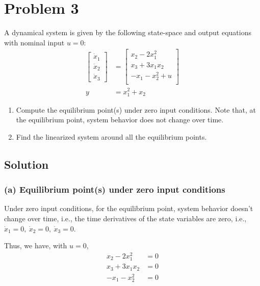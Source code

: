 \section*{Problem 3}

A dynamical system is given by the following state-space and output equations with nominal input \( u = 0\):
\begin{align*}
    \begin{bmatrix}
        \dot{x}_1 \\
        \dot{x}_2 \\
        \dot{x}_3
    \end{bmatrix}
      & =
    \begin{bmatrix}
        x_2 - 2 x_1^2    \\
        x_3 + 3 x_1 x_2  \\
        -x_1 - x_2^2 + u \\
    \end{bmatrix}
    \\
    y & = x_1^2 + x_2
\end{align*}

\begin{enumerate}[label= (\alph*)]
    \item Compute the equilibrium point(s) under zero input conditions.
          Note that, at the equilibrium point, system behavior does not change over time.
    \item Find the linearized system around all the equilibrium points.
\end{enumerate}

\subsection*{Solution}

\subsubsection*{(a) Equilibrium point(s) under zero input conditions}

Under zero input conditions, for the equilibrium point, system behavior doesn't change over time, i.e., the time derivatives of the state variables are zero, i.e., \( \dot x_1 = 0, \ \dot x_2 = 0, \ \dot x_3 = 0 \).

Thus, we have, with \( u = 0 \),
\begin{align*}
    x_2 - 2 x_1^2   & = 0 \\
    x_3 + 3 x_1 x_2 & = 0 \\
    -x_1 - x_2^2    & = 0
\end{align*}

